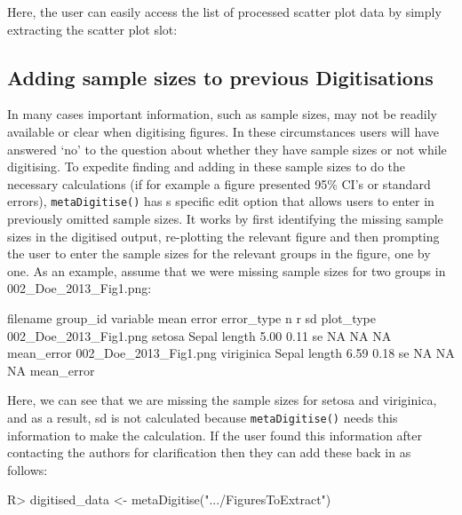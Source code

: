 \documentclass[12pt]{article}
\newcommand{\fct}[1]{\texttt{#1()}}
\begin{document}
Here, the user can easily access the list of processed scatter plot data by simply extracting the scatter plot slot:

\begin{CodeChunk}
\end{CodeChunk}

\subsection{Adding sample sizes to previous Digitisations}
In many cases important information, such as sample sizes, may not be readily available or clear when digitising figures. In these circumstances users will have answered `no' to the question about whether they have sample sizes or not while digitising. To expedite finding and adding in these sample sizes to do the necessary calculations (if for example a figure presented 95\% CI's or standard errors), \fct{metaDigitise} has s specific edit option that allows users to enter in previously omitted sample sizes. It works by first identifying the missing sample sizes in the digitised output, re-plotting the relevant figure and then prompting the user to enter the sample sizes for the relevant groups in the figure, one by one. As an example, assume that we were missing sample sizes for two groups in 002\_Doe\_2013\_Fig1.png:

\begin{CodeChunk}
{\scriptsize
\begin{CodeOutput}
            filename    group_id         variable   mean  error error_type n    r    sd   plot_type
002_Doe_2013_Fig1.png      setosa  Sepal length      5.00  0.11  se        NA  NA    NA  mean_error
002_Doe_2013_Fig1.png  viriginica  Sepal length      6.59  0.18  se        NA  NA    NA  mean_error
\end{CodeOutput}
}
\end{CodeChunk}

Here, we can see that we are missing the sample sizes for setosa and viriginica, and as a result, sd is not calculated because \fct{metaDigitise} needs this information to make the calculation. If the user found this information after contacting the authors for clarification then they can add these back in as follows:

\begin{CodeChunk}
\begin{CodeInput}
R> digitised_data <- metaDigitise(".../FiguresToExtract")
\end{CodeInput}
\end{CodeChunk}
\end{document}
